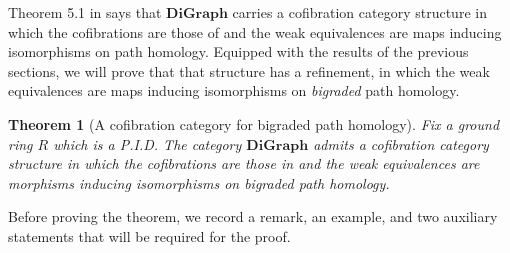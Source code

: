 \documentclass[a4paper, 11 pt, oneside, reqno]{amsart}
\numberwithin{lemma}{section}
\newtheorem{theorem}[lemma]{Theorem}
\theoremstyle{definition}
\newcommand{\cn}[1]{\mathbf{#1}}
\newcommand{\DiGraph}{\cn{DiGraph}}
\begin{document}
Theorem 5.1 in \cite{CDKOSW} says that \(\DiGraph\) carries a cofibration category structure in which the cofibrations are those of  and the weak equivalences are maps inducing isomorphisms on path homology. Equipped with the results of the previous sections, we will prove that that structure has a refinement, in which the weak equivalences are maps inducing isomorphisms on \emph{bigraded} path homology.

\begin{theorem}[A cofibration category for bigraded path homology]
\label{thm:cofib_cat}
    Fix a ground ring \(R\) which is a P.I.D. The category \(\cn{DiGraph}\) admits a cofibration category structure in which the cofibrations are those in  and the weak equivalences are morphisms inducing isomorphisms on bigraded path homology.
\end{theorem}

Before proving the theorem, we record a remark, an example, and two auxiliary statements that will be required for the proof.
\end{document}

